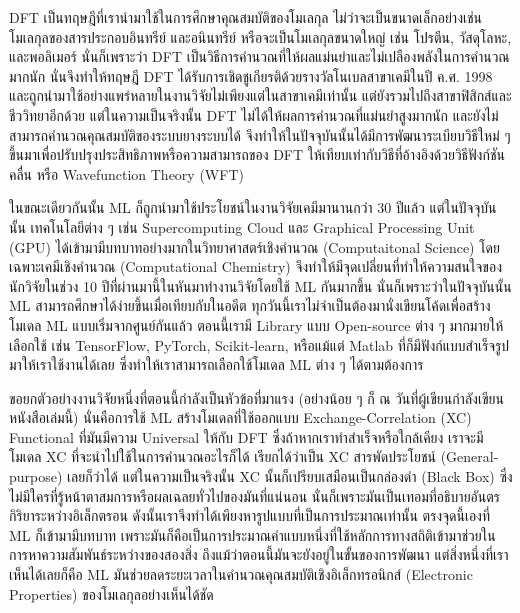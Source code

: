 DFT เป็นทฤษฎีที่เรานำมาใช้ในการศึกษาคุณสมบัติของโมเลกุล ไม่ว่าจะเป็นขนาดเล็กอย่างเช่นโมเลกุลของสารประกอบอินทรีย์ และอนินทรีย์ 
หรือจะเป็นโมเลกุลขนาดใหญ่ เช่น โปรตีน, วัสดุโลหะ, และพอลิเมอร์ นั่นก็เพราะว่า DFT เป็นวิธีการคำนวณที่ให้ผลแม่นยำและไม่เปลืองพลังในการคำนวณมากนัก 
นั่นจึงทำให้ทฤษฎี DFT ได้รับการเชิดชูเกียรติด้วยรางวัลโนเบลสาขาเคมีในปี ค.ศ. 1998 และถูกนำมาใช้อย่างแพร่หลายในงานวิจัยไม่เพียงแต่ในสาขาเคมีเท่านั้น 
แต่ยังรวมไปถึงสาขาฟิสิกส์และชีววิทยาอีกด้วย แต่ในความเป็นจริงนั้น DFT ไม่ได้ให้ผลการคำนวณที่แม่นยำสูงมากนัก และยังไม่สามารถคำนวณคุณสมบัติของระบบยางระบบได้ 
จึงทำให้ในปัจจุบันนั้นได้มีการพัฒนาระเบียบวิธีใหม่ ๆ ขึ้นมาเพื่อปรับปรุงประสิทธิภาพหรือความสามารถของ DFT ให้เทียบเท่ากับวิธีที่อ้างอิงด้วยวิธีฟังก์ชันคลื่น หรือ Wavefunction Theory (WFT)

ในขณะเดียวกันนั้น ML ก็ถูกนำมาใช้ประโยชน์ในงานวิจัยเคมีมานานกว่า 30 ปีแล้ว แต่ในปัจจุบันนั้น เทคโนโลยีต่าง ๆ เช่น Supercomputing Cloud และ Graphical Processing Unit (GPU)
ได้เข้ามามีบทบาทอย่างมากในวิทยาศาสตร์เชิงคำนวณ (Computaitonal Science) โดยเฉพาะเคมีเชิงคำนวณ (Computational Chemistry) 
จึงทำให้มีจุดเปลี่ยนที่ทำให้ความสนใจของนักวิจัยในช่วง 10 ปีที่ผ่านมานี้ในหันมาทำงานวิจัยโดยใช้ ML กันมากขึ้น นั่นก็เพราะว่าในปัจจุบันนั้น ML สามารถศึกษาได้ง่ายขึ้นเมื่อเทียบกับในอดีต
ทุกวันนี้เราไม่จำเป็นต้องมานั่งเขียนโค้ดเพื่อสร้างโมเดล ML แบบเริ่มจากศูนย์กันแล้ว ตอนนี้เรามี Library แบบ Open-source ต่าง ๆ มากมายให้เลือกใช้ 
เช่น TensorFlow, PyTorch, Scikit-learn, หรือแม้แต่ Matlab ที่ก็มีฟังก์แบบสำเร็จรูปมาให้เราใช้งานได้เลย ซึ่งทำให้เราสามารถเลือกใช้โมเดล ML ต่าง ๆ ได้ตามต้องการ

ขอยกตัวอย่างงานวิจัยหนึ่งที่ตอนนี้กำลังเป็นหัวข้อที่มาแรง (อย่างน้อย ๆ ก็ ณ วันที่ผู้เขียนกำลังเขียนหนังสือเล่มนี้) นั่นคือการใช้ ML สร้างโมเดลที่ใช้ออกแบบ 
Exchange-Correlation (XC) Functional ที่มันมีความ Universal ให้กับ DFT ซึ่งถ้าหากเราทำสำเร็จหรือใกล้เคียง เราจะมีโมเดล XC ที่จะนำไปใช้ในการคำนวณอะไรก็ได้
เรียกได้ว่าเป็น XC สารพัดประโยชน์ (General-purpose) เลยก็ว่าได้ แต่ในความเป็นจริงนั้น XC นั้นก็เปรียบเสมือนเป็นกล่องดำ (Black Box) 
ซึ่งไม่มีใครที่รู้หน้าตาสมการหรือผลเฉลยทั่วไปของมันที่แน่นอน นั่นก็เพราะมันเป็นเทอมที่อธิบายอันตรกิริยาระหว่างอิเล็กตรอน ดังนั้นเราจึงทำได้เพียงหารูปแบบที่เป็นการประมาณเท่านั้น
ตรงจุดนี้เองที่ ML ก็เข้ามามีบทบาท เพราะมันก็คือเป็นการประมาณค่าแบบหนึ่งที่ใช้หลักการทางสถิติเข้ามาช่วยในการหาความสัมพันธ์ระหว่างของสองสิ่ง 
ถึงแม้ว่าตอนนี้มันจะยังอยู่ในขั้นของการพัฒนา แต่สิ่งหนึ่งที่เราเห็นได้เลยก็คือ ML มันช่วยลดระยะเวลาในคำนวณคุณสมบัติเชิงอิเล็กทรอนิกส์ (Electronic Properties) 
ของโมเลกุลอย่างเห็นได้ชัด

